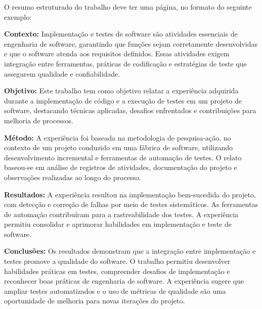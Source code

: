 
\begin{resumo} 
O resumo estruturado do trabalho deve ter uma página, no formato do seguinte exemplo:

\textbf{Contexto:}
Implementação e testes de software são atividades essenciais de engenharia de software, garantindo que funções sejam corretamente desenvolvidas e que o software atenda aos requisitos definidos. Essas atividades exigem integração entre ferramentas, práticas de codificação e estratégias de teste que assegurem qualidade e confiabilidade.

\textbf{Objetivo:}
Este trabalho tem como objetivo relatar a experiência adquirida durante a implementação de código e a execução de testes em um projeto de software, destacando técnicas aplicadas, desafios enfrentados e contribuições para melhoria de processos.

\textbf{Método:}
A experiência foi baseada na metodologia de pesquisa-ação, no contexto de um projeto conduzido em uma fábrica de software, utilizando desenvolvimento incremental e ferramentas de automação de testes. O relato baseou-se em análise de registros de atividades, documentação do projeto e observações realizadas ao longo do processo.

\textbf{Resultados:}
A experiência resultou na implementação bem-sucedida do projeto, com detecção e correção de falhas por meio de testes sistemáticos. As ferramentas de automação contribuíram para a rastreabilidade dos testes. 
A experiência permitiu consolidar e aprimorar habilidades em implementação e teste de software. 

\textbf{Conclusões:}
Os resultados demonstram que a integração entre implementação e testes promove a qualidade do software. O trabalho permitiu desenvolver habilidades práticas em testes, compreender desafios de implementação e reconhecer boas práticas de engenharia de software. A experiência sugere que ampliar testes automatizados e o uso de métricas de qualidade são uma oportunidade de melhoria para novas iterações do projeto.

\end{resumo}
